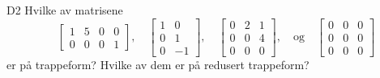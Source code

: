 \documentclass[a4paper,norsk,11pt]{interaktiv}
\begin{document}
\begin{oppgave}{D2}
	Hvilke av matrisene 	
		\[
		 \quad
		\begin{bmatrix}
		1 & 5 & 0 & 0 \\
		0 & 0 & 0 & 1
		\end{bmatrix},
		\quad
		\begin{bmatrix}
		1 & 0 \\
		0 & 1 \\
		0 & -1
		\end{bmatrix},
		\quad
		\begin{bmatrix}
		0 & 2 & 1 \\
		0 & 0 & 4 \\
		0 & 0 & 0
		\end{bmatrix},
		\quad \text{og} \quad		
		\begin{bmatrix}
		0 & 0 & 0 \\
		0 & 0 & 0 \\
		0 & 0 & 0
		\end{bmatrix}
		\]
	er på trappeform?  Hvilke av dem er på
	redusert trappeform?
\end{oppgave}
\end{document}

